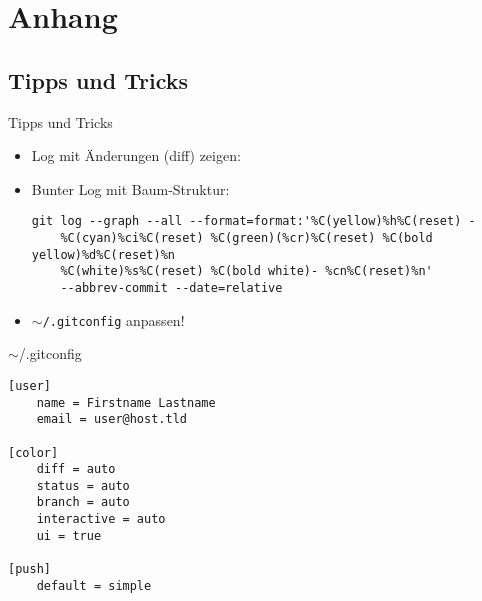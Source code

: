\section{Anhang}

\subsection{Tipps und Tricks}
\begin{frame}[fragile]{Tipps und Tricks}
    \begin{itemize}
        \item Log mit Änderungen (diff) zeigen:
        \item Bunter Log mit Baum-Struktur:

{\scriptsize\begin{verbatim}
git log --graph --all --format=format:'%C(yellow)%h%C(reset) -
    %C(cyan)%ci%C(reset) %C(green)(%cr)%C(reset) %C(bold yellow)%d%C(reset)%n
    %C(white)%s%C(reset) %C(bold white)- %cn%C(reset)%n'
    --abbrev-commit --date=relative
\end{verbatim}}
        \item \texttt{$\sim$/.gitconfig} anpassen!
    \end{itemize}
\end{frame}

\begin{frame}[fragile]{$\sim$/.gitconfig}
\begin{verbatim}
[user]
    name = Firstname Lastname
    email = user@host.tld

[color]
    diff = auto
    status = auto
    branch = auto
    interactive = auto
    ui = true

[push]
    default = simple
\end{verbatim}
\end{frame}


